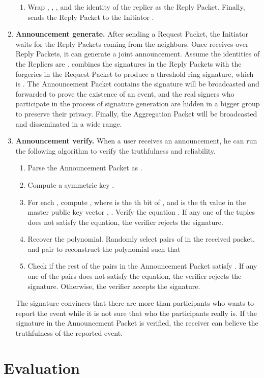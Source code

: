 \documentclass[a4paper]{article}
\begin{document}
\begin{enumerate}
\begin{enumerate}
        \item Wrap , , , and the identity of the replier  as the Reply Packet. Finally,  sends the Reply Packet to the Initiator .
        \end{enumerate}
 \item \textbf{Announcement generate.} After sending a Request Packet, the Initiator  waits for the Reply Packets coming from the neighbors. Once  receives over  Reply Packets, it can generate a joint announcement. Assume the identities of the Repliers are .  combines the signatures in the Reply Packets with the forgeries in the Request Packet to produce a threshold ring signature, which is . The Announcement Packet contains the signature will be broadcasted and forwarded to prove the existence of an event, and the real signers who participate in the process of signature generation are hidden in a bigger group to preserve their privacy. Finally, the Aggregation Packet will be broadcasted and disseminated in a wide range.
 \item \textbf{Announcement verify.} When a user receives an announcement, he can run the following algorithm to verify the truthfulness and reliability.
        \begin{enumerate}
        \item Parse the Announcement Packet as .
        \item Compute a symmetric key .
        \item For each , compute , where  is the th bit of , and  is the th value in the master public key vector , . Verify the equation . If any one of the tuples  does not satisfy the equation, the verifier rejects the signature.
        \item Recover the polynomial. Randomly select  pairs of  in the received packet, and pair  to reconstruct the polynomial  such that 
        \item Check if the rest of the pairs  in the Announcement Packet satisfy . If any one of the pairs does not satisfy the equation, the verifier rejects the signature. Otherwise, the verifier accepts the signature.
        \end{enumerate}
        The signature convinces that there are more than  participants who wants to report the event while it is not sure that who the participants really is. If the signature in the Announcement Packet is verified, the receiver can believe the truthfulness of the reported event.
\end{enumerate}
\section{Evaluation}
\end{document}
